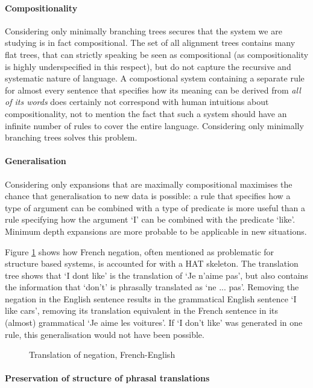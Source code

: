 \documentclass[hidelinks]{report}
\begin{document}
\paragraph{Compositionality} Considering only minimally branching trees secures that the system we are studying is in fact compositional. The set of all alignment trees contains many flat trees, that can strictly speaking be seen as compositional (as compositionality is highly underspecified in this respect), but do not capture the recursive and systematic nature of language. A compostional system containing a separate rule for almost every sentence that specifies how its meaning can be derived from \textit{all of its words} does certainly not correspond with human intuitions about compositionality, not to mention the fact that such a system should have an infinite number of rules to cover the entire language. Considering only minimally branching trees solves this problem.

\paragraph{Generalisation} Considering only expansions that are maximally compositional maximises the chance that generalisation to new data is possible: a rule that specifies how a type of argument can be combined with a type of predicate is more useful than a rule specifying how the argument `I' can be combined with the predicate `like'. Minimum depth expansions are more probable to be applicable in new situations. 

Figure \ref{fig:nepas} shows how French negation, often mentioned as problematic for structure based systems, is accounted for with a HAT skeleton. The translation tree shows that `I dont like' is the translation of `Je n'aime pas', but also contains the information that `don't' is phrasally translated as `ne ... pas'. Removing the negation in the English sentence results in the grammatical English sentence `I like cars', removing its translation equivalent in the French sentence in its (almost) grammatical `Je aime les voitures'. If `I don't like' was generated in one rule, this generalisation would not have been possible.

\begin{figure}[!ht]
\centering

\caption{Translation of negation, French-English}\label{fig:nepas}
\end{figure} 

\paragraph{Preservation of structure of phrasal translations}
\end{document}
